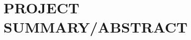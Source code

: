 \documentclass[11pt,letterpaper]{article}
\begin{document}
\section{PROJECT SUMMARY/ABSTRACT}

\end{document}
